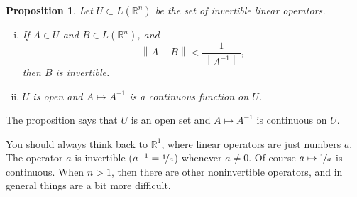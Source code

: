 \documentclass[12pt]{book}
\newcommand{\norm}[1]{\left\lVert {#1} \right\rVert}
\newcommand{\R}{{\mathbb{R}}}
\theoremstyle{plain}
\newtheorem{prop}[thm]{Proposition}
\theoremstyle{remark}
\theoremstyle{definition}
\theoremstyle{exercise}
\theoremstyle{example}
\begin{document}
\begin{prop}
Let $U \subset L(\R^n)$ be the set of invertible linear operators.
\begin{enumerate}[(i)]
\item If $A \in U$ and $B \in L(\R^n)$, and
\begin{equation} \label{eqcontineq}
\norm{A-B} <  \frac{1}{\norm{A^{-1}}},
\end{equation}
then $B$ is invertible.
\item $U$ is open and $A \mapsto A^{-1}$ is a continuous
function on $U$.
\end{enumerate}
\end{prop}

The proposition says that $U$ is an open set and $A \mapsto A^{-1}$ is
continuous on $U$.

You should always think back to $\R^1$, where linear operators are just
numbers $a$.  The operator $a$ is invertible ($a^{-1} = \nicefrac{1}{a}$)
whenever $a \not=0$.  Of course $a \mapsto \nicefrac{1}{a}$ is continuous.
When $n > 1$, then there are other noninvertible operators, and in general
things are a bit more difficult.
\end{document}
